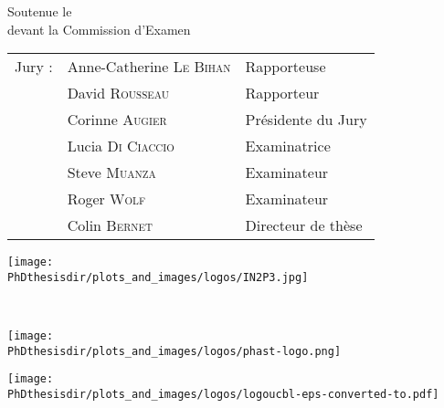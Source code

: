 \begin{center}
\vspace{\baselineskip}

\begin{minipage}{.95\textwidth}
\begin{center}
{\huge\textbf{\inserttitle}}
\end{center}
\end{minipage}

\vspace{\baselineskip}

\vfill

Soutenue le \insertdate\\
devant la Commission d'Examen

\vspace{\baselineskip}

\begin{tabular}{lll}
Jury :
& Anne-Catherine \textsc{Le Bihan} \qquad\qquad & Rapporteuse\\
& David \textsc{Rousseau} & Rapporteur\\
& Corinne \textsc{Augier} & Présidente du Jury\\
& Lucia \textsc{Di Ciaccio} & Examinatrice\\
& Steve \textsc{Muanza}  & Examinateur\\
& Roger \textsc{Wolf} & Examinateur\\
& Colin \textsc{Bernet} & Directeur de thèse \\
\end{tabular}

\vfill

\vfill

\begin{minipage}[t]{.3\textwidth}
\begin{center}
\texttt{[image: \\PhDthesisdir/plots\_and\_images/logos/IN2P3.jpg]}
\end{center}

~
\end{minipage}
\hfill
\begin{minipage}[t]{.3\textwidth}
\begin{center}
\texttt{[image: \\PhDthesisdir/plots\_and\_images/logos/phast-logo.png]}
\end{center}
\end{minipage}
\hfill
\begin{minipage}[t]{.3\textwidth}
\begin{center}
\texttt{[image: \\PhDthesisdir/plots\_and\_images/logos/logoucbl-eps-converted-to.pdf]}
\end{center}

~
\end{minipage}

\vspace{-2cm}

\end{center}
